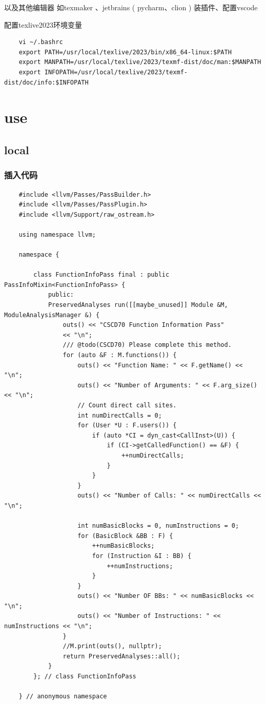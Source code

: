 \documentclass[11pt]{ctexart}
\begin{document}
以及其他编辑器 如texmaker 、jetbrains ( pycharm、clion ) 装插件、配置vscode


配置texlive2023环境变量

\begin{lstlisting}
	vi ~/.bashrc
	export PATH=/usr/local/texlive/2023/bin/x86_64-linux:$PATH
	export MANPATH=/usr/local/texlive/2023/texmf-dist/doc/man:$MANPATH
	export INFOPATH=/usr/local/texlive/2023/texmf-dist/doc/info:$INFOPATH
\end{lstlisting}




\newpage

\section{use}

\subsection{local}

\subsubsection{ 插入代码}

\begin{lstlisting}
	#include <llvm/Passes/PassBuilder.h>
	#include <llvm/Passes/PassPlugin.h>
	#include <llvm/Support/raw_ostream.h>
	
	using namespace llvm;
	
	namespace {
		
		class FunctionInfoPass final : public PassInfoMixin<FunctionInfoPass> {
			public:
			PreservedAnalyses run([[maybe_unused]] Module &M, ModuleAnalysisManager &) {
				outs() << "CSCD70 Function Information Pass"
				<< "\n";
				/// @todo(CSCD70) Please complete this method.
				for (auto &F : M.functions()) {
					outs() << "Function Name: " << F.getName() << "\n";
					outs() << "Number of Arguments: " << F.arg_size() << "\n";
					// Count direct call sites.
					int numDirectCalls = 0;
					for (User *U : F.users()) {
						if (auto *CI = dyn_cast<CallInst>(U)) {
							if (CI->getCalledFunction() == &F) {
								++numDirectCalls;
							}
						}
					}
					outs() << "Number of Calls: " << numDirectCalls << "\n";
					
					int numBasicBlocks = 0, numInstructions = 0;
					for (BasicBlock &BB : F) {
						++numBasicBlocks;
						for (Instruction &I : BB) {
							++numInstructions;
						}
					}
					outs() << "Number OF BBs: " << numBasicBlocks << "\n";
					outs() << "Number of Instructions: " << numInstructions << "\n";
				}
				//M.print(outs(), nullptr);
				return PreservedAnalyses::all();
			}
		}; // class FunctionInfoPass
		
	} // anonymous namespace
\end{lstlisting}
\end{document}
